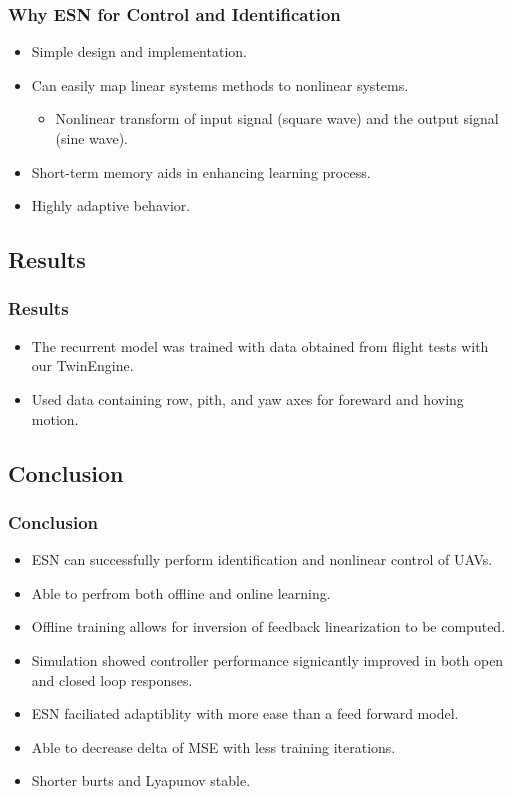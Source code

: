 \documentclass{beamer}
\begin{document}
	\begin{frame}
		\frametitle{Why ESN for Control and Identification}
		\begin{itemize}
			\item Simple design and implementation.
			\item Can easily map linear systems methods to nonlinear systems.
			\begin{itemize}
				\item Nonlinear transform of input signal (square wave) and the output signal (sine wave).
			\end{itemize}
			\item Short-term memory aids in enhancing learning process.
			\item Highly adaptive behavior. 
		\end{itemize}
	\end{frame}

	\begin{frame}
		\section[Results]{Results}
		\frametitle{Results}

		\begin{itemize}
			\item The recurrent model was trained with data obtained from flight tests with our TwinEngine.
			\item Used data containing row, pith, and yaw axes for foreward and hoving motion.
		\end{itemize}
	\end{frame}

	\begin{frame}
		\section[Conclusion]{Conclusion}
		\frametitle{Conclusion}
		\begin{itemize}
			\item ESN can successfully perform identification and nonlinear control of UAVs.
			\item Able to perfrom both offline and online learning.
			\item Offline training allows for inversion of feedback linearization to be computed.
			\item Simulation showed controller performance signicantly improved in both open and closed loop responses.
			\item ESN faciliated adaptiblity with more ease than a feed forward model.
			\item Able to decrease delta of MSE with less training iterations.
			\item Shorter burts and Lyapunov stable.	
		\end{itemize}
	\end{frame}
\end{document}
